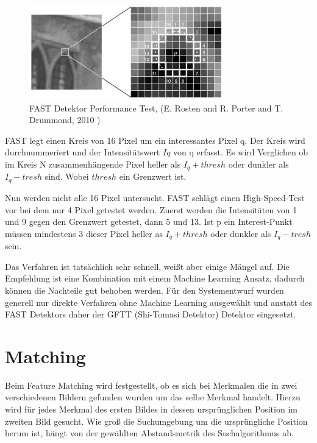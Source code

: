 \begin{figure}[!ht]
  \centering
  \includegraphics[width=0.75\textwidth]{pictures/03_fast_speedtest.jpg}
  \caption[FAST Detektor Speedtest]{FAST Detektor Performance Test, (E. Rosten and R. Porter and T. Drummond, 2010 \cite{FAST})}
\end{figure}

FAST legt einen Kreis von 16 Pixel um ein interessantes Pixel q. Der Kreis wird durchnummeriert und der Intensitätswert $Iq$ von q erfasst. Es wird Verglichen ob im Kreis N zusammenhängende Pixel heller als $I_q+thresh$ oder dunkler als $I_q-tresh$ sind. Wobei $thresh$ ein Grenzwert ist.\newline

Nun werden nicht alle 16 Pixel untersucht. FAST schlägt einen High-Speed-Test vor bei dem nur 4 Pixel getestet werden. Zuerst werden die Intensitäten von 1 und 9 gegen den Grenzwert getestet, dann 5 und 13. Ist p ein Interest-Punkt müssen mindestens 3 dieser Pixel heller as $I_q + thresh$ oder dunkler als $I_q - tresh$ sein.\newline

Das Verfahren ist tatsächlich sehr schnell, wei{\ss}t aber einige Mängel auf. Die Empfehlung ist eine Kombination mit einem Machine Learning Ansatz, dadurch können die Nachteile gut behoben werden. \cite{cvdocFAST} Für den Systementwurf wurden generell nur direkte Verfahren ohne Machine Learning ausgewählt und anstatt des FAST Detektors daher der GFTT (Shi-Tomasi Detektor) Detektor eingesetzt.


%
\pagebreak
\section{Matching}
Beim Feature Matching wird festgestellt, ob es sich bei Merkmalen die in zwei verschiedenen Bildern gefunden wurden um das selbe Merkmal handelt. Hierzu wird für jedes Merkmal des ersten Bildes in dessen ursprünglichen Position im zweiten Bild gesucht. Wie gro{\ss} die Suchumgebung um die ursprüngliche Position herum ist, hängt von der gewählten Abstandsmetrik des Suchalgorithmus ab.
\newline

